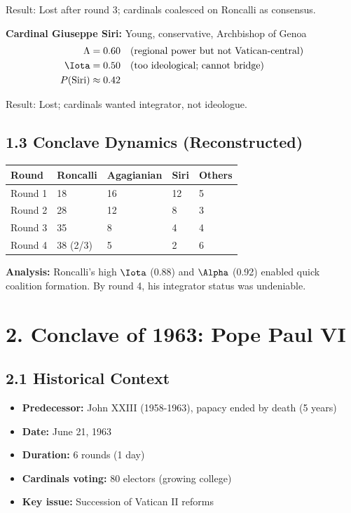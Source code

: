 \documentclass[11pt]{article}
\begin{document}
Result: Lost after round 3; cardinals coalesced on Roncalli as consensus.

\textbf{Cardinal Giuseppe Siri:} Young, conservative, Archbishop of Genoa
\begin{align*}
\Lambda &= 0.60 \quad \text{(regional power but not Vatican-central)} \\
\Iota &= 0.50 \quad \text{(too ideological; cannot bridge)} \\
P(\text{Siri}) &\approx 0.42
\end{align*}

Result: Lost; cardinals wanted integrator, not ideologue.

\subsection{1.3 Conclave Dynamics (Reconstructed)}

\begin{table}[h]
\centering
\begin{tabular}{|l|l|l|l|l|}
\hline
\textbf{Round} & \textbf{Roncalli} & \textbf{Agagianian} & \textbf{Siri} & \textbf{Others} \\
\hline
Round 1 & 18 & 16 & 12 & 5 \\
Round 2 & 28 & 12 & 8 & 3 \\
Round 3 & 35 & 8 & 4 & 4 \\
Round 4 & 38 (2/3) & 5 & 2 & 6 \\
\hline
\end{tabular}
\end{table}

\textbf{Analysis:} Roncalli's high $\Iota$ (0.88) and $\Alpha$ (0.92) enabled quick coalition formation. By round 4, his integrator status was undeniable.

\section{2. Conclave of 1963: Pope Paul VI}

\subsection{2.1 Historical Context}

\begin{itemize}
\item \textbf{Predecessor:} John XXIII (1958-1963), papacy ended by death (5 years)
\item \textbf{Date:} June 21, 1963
\item \textbf{Duration:} 6 rounds (1 day)
\item \textbf{Cardinals voting:} 80 electors (growing college)
\item \textbf{Key issue:} Succession of Vatican II reforms
\end{itemize}
\end{document}
